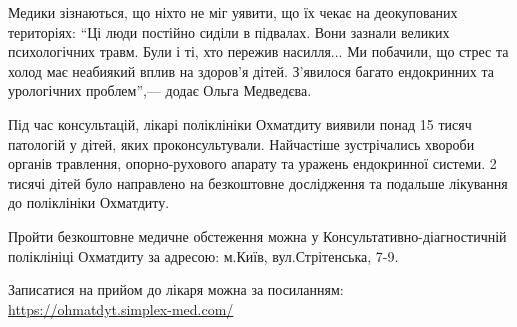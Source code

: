 
Медики зізнаються, що ніхто не міг уявити, що їх чекає на деокупованих
територіях: \enquote{Ці люди постійно сиділи в підвалах. Вони зазнали великих
психологічних травм. Були і ті, хто пережив насилля... Ми побачили, що стрес та
холод має неабиякий вплив на здоров'я дітей. З'явилося багато ендокринних та
урологічних проблем},— додає Ольга Медведєва.


Під час консультацій, лікарі поліклініки Охматдиту виявили понад 15 тисяч
патологій у дітей, яких проконсультували. Найчастіше зустрічались хвороби
органів травлення, опорно-рухового апарату та уражень ендокринної системи. 2
тисячі дітей було направлено на безкоштовне дослідження та подальше лікування
до поліклініки Охматдиту.🏥

Пройти безкоштовне медичне обстеження можна у Консультативно-діагностичній
поліклініці Охматдиту за адресою: м.Київ, вул.Стрітенська, 7-9.

Записатися на прийом до лікаря можна за посиланням: \url{https://ohmatdyt.simplex-med.com/}














